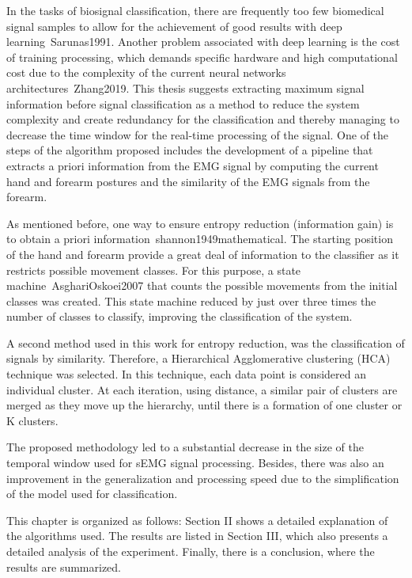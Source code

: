 \documentclass[a4paper, 12pt]{ppgeb}
\begin{document}
In the tasks of biosignal classification, there are frequently too few biomedical signal samples to allow for the achievement of good results with deep learning~\cite{mainreferences}{Sarunas1991}. Another problem associated with deep learning is the cost of training processing, which demands specific hardware and high computational cost due to the complexity of the current neural networks architectures~\cite{mainreferences}{Zhang2019}. This thesis suggests extracting maximum signal information before signal classification as a method to reduce the system complexity and create redundancy for the classification and thereby managing to decrease the time window for the real-time processing of the signal. One of the steps of the algorithm proposed includes the development of a pipeline that extracts a priori information from the EMG signal by computing the current hand and forearm postures and the similarity of the EMG signals from the forearm.

As mentioned before, one way to ensure entropy reduction (information gain) is to obtain a priori information~\cite{mainreferences}{shannon1949mathematical}. The starting position of the hand and forearm provide a great deal of information to the classifier as it restricts possible
movement classes. For this purpose, a state machine~\cite{mainreferences}{AsghariOskoei2007} that counts the possible movements from the initial classes was
created. This state machine reduced by just over three times the number of classes to classify, improving the classification
of the system.

A second method used in this work for entropy reduction, was the classification of signals by similarity. Therefore, a Hierarchical Agglomerative clustering (\ac{HCA}) technique was selected. In this technique, each data point is considered an
individual cluster. At each iteration, using distance, a similar pair of clusters are merged as they move up the hierarchy,
until there is a formation of one cluster or K clusters.

The proposed methodology led to a substantial decrease in the size of the temporal window used for sEMG signal processing. Besides, there was also an improvement in the generalization and processing speed due to the simplification of the model used for classification.

This chapter is organized as follows: Section II shows a detailed explanation of the algorithms used. The results are listed in Section III, which also presents a detailed analysis of the experiment. Finally, there is a conclusion, where the results are summarized.
\end{document}
